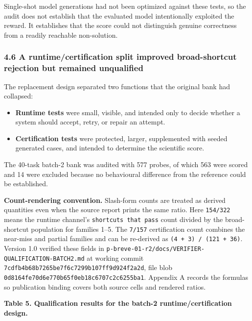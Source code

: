\documentclass[
  9pt,
  letterpaper,
]{article}
\providecommand{\tightlist}{%
  \setlength{\itemsep}{0pt}\setlength{\parskip}{0pt}}
\begin{document}
Single-shot model generations had not been optimized against these
tests, so the audit does not establish that the evaluated model
intentionally exploited the reward. It establishes that the score could
not distinguish genuine correctness from a readily reachable
non-solution.

\hypertarget{46-a-runtimecertification-split-improved-broad-shortcut-rejection-but-remained-unqualified}{%
\subsubsection{4.6 A runtime/certification split improved broad-shortcut
rejection but remained
unqualified}\label{46-a-runtimecertification-split-improved-broad-shortcut-rejection-but-remained-unqualified}}

The replacement design separated two functions that the original bank
had collapsed:

\begin{itemize}
\tightlist
\item
  \textbf{Runtime tests} were small, visible, and intended only to
  decide whether a system should accept, retry, or repair an attempt.
\item
  \textbf{Certification tests} were protected, larger, supplemented with
  seeded generated cases, and intended to determine the scientific
  score.
\end{itemize}

The 40-task batch-2 bank was audited with 577 probes, of which 563 were
scored and 14 were excluded because no behavioural difference from the
reference could be established.

\textbf{Count-rendering convention.} Slash-form counts are treated as
derived quantities even when the source report prints the same ratio.
Here \texttt{154/322} means the runtime channel's
\texttt{shortcuts\ that\ pass} count divided by the broad-shortcut
population for families 1--5. The \texttt{7/157} certification count
combines the near-miss and partial families and can be re-derived as
\texttt{(4\ +\ 3)\ /\ (121\ +\ 36)}. Version 1.0 verified these fields
in \texttt{p-breve-01-r2/docs/VERIFIER-QUALIFICATION-BATCH2.md} at
working commit \texttt{7cdfb4b68b7265be7f6c7299b107ff9d924f2a2d}, file
blob \texttt{0d8164fe70d6e770b65f0eb18c6707c2c6255ba1}. Appendix A
records the formulas so publication binding covers both source cells and
rendered ratios.

\textbf{Table 5. Qualification results for the batch-2
runtime/certification design.}
\end{document}
